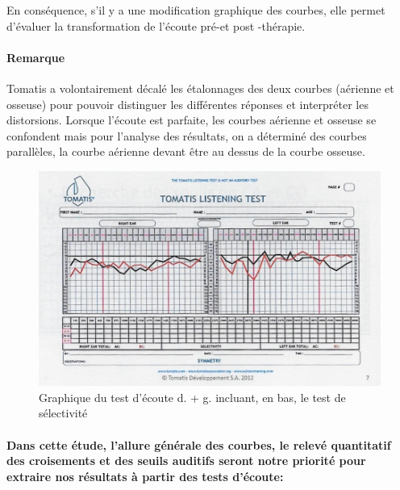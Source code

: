  En  conséquence,  s'il y a une modification
          graphique des courbes, elle 
          permet d'évaluer la transformation de l'écoute pré-et
          post -thérapie.
          

 
 







\paragraph{Remarque}


Tomatis a volontairement décalé les étalonnages des deux courbes (aérienne
	et osseuse) pour pouvoir distinguer les différentes réponses et interpréter
	les distorsions. Lorsque l'écoute est parfaite, les
	courbes aérienne et osseuse se confondent mais pour l'analyse des
	résultats, on a déterminé des courbes parallèles, la courbe aérienne
	devant être au dessus de la courbe osseuse.


\begin{figure}
	\centering
	\includegraphics[width=0.7\linewidth]{images/tomatisListeningTest.jpg}
	\caption[Graphique du test d'écoute]{Graphique du test
          d'écoute d. + g. incluant, en bas, le test de sélectivité}
	\label{fig:tomatislisteningtest}
\end{figure}


\paragraph{Dans cette étude, l'allure générale des courbes, le relevé quantitatif des
  croisements et des seuils auditifs seront notre priorité pour
  extraire nos résultats à partir des tests d'écoute:} 

